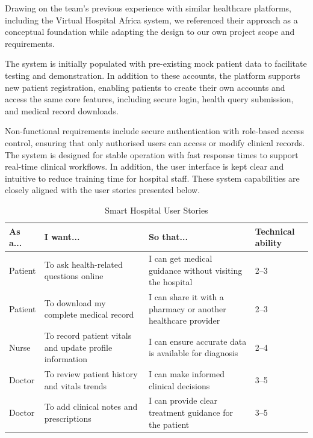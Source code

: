 Drawing on the team’s previous experience with similar healthcare platforms, including the Virtual Hospital Africa system, we referenced their approach as a conceptual foundation while adapting the design to our own project scope and requirements.

The system is initially populated with pre-existing mock patient data to facilitate testing and demonstration. In addition to these accounts, the platform supports new patient registration, enabling patients to create their own accounts and access the same core features, including secure login, health query submission, and medical record downloads.

Non-functional requirements include secure authentication with role-based access control, ensuring that only authorised users can access or modify clinical records. The system is designed for stable operation with fast response times to support real-time clinical workflows. In addition, the user interface is kept clear and intuitive to reduce training time for hospital staff. These system capabilities are closely aligned with the user stories
presented below.

\vspace{1em}
\begin{table}[H]
\centering
\renewcommand{\arraystretch}{1.4}
\begin{tabular}{|p{2cm}|p{5.2cm}|p{5.2cm}|p{2cm}|}
\hline
\textbf{As a...} & \textbf{I want...} & \textbf{So that...} & \textbf{Technical ability} \\
\hline
Patient & To ask health-related questions online & I can get medical guidance without visiting the hospital & 2--3 \\
\hline
Patient & To download my complete medical record & I can share it with a pharmacy or another healthcare provider & 2--3 \\
\hline
Nurse & To record patient vitals and update profile information & I can ensure accurate data is available for diagnosis & 2--4 \\
\hline
Doctor & To review patient history and vitals trends & I can make informed clinical decisions & 3--5 \\
\hline
Doctor & To add clinical notes and prescriptions & I can provide clear treatment guidance for the patient & 3--5 \\
\hline
\end{tabular}
\caption{Smart Hospital User Stories}
\label{tab:user-stories}
\end{table}
\vspace{1em}
